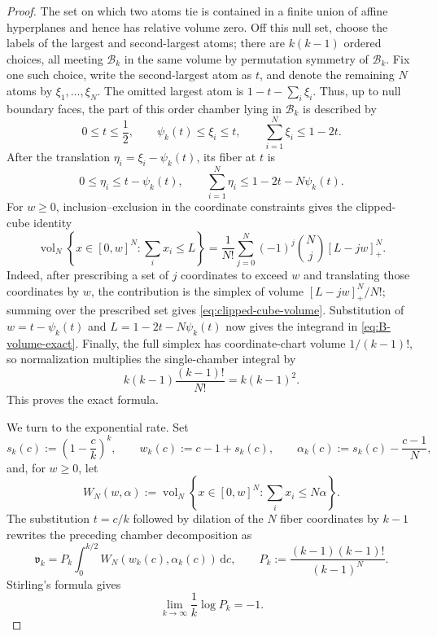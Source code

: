 \documentclass[10pt,a4paper]{amsart}
\newcommand{\body}{\mathcal{B}}
\begin{document}
\begin{proof}
The set on which two atoms tie is contained in a finite union of affine
hyperplanes and hence has relative volume zero.  Off this null set, choose
the labels of the largest and second-largest atoms; there are $k(k-1)$
ordered choices, all meeting $\body_k$ in the same volume by permutation
symmetry of $\body_k$.  Fix one such choice, write the
second-largest atom as $t$, and denote the remaining $N$ atoms by
$\xi_1,\ldots,\xi_N$.  The omitted largest atom is
$1-t-\sum_i\xi_i$.  Thus, up to null boundary faces, the part of this
order chamber lying in $\body_k$ is described by
\[
 0\le t\le\frac12,\qquad
 \psi_k(t)\le\xi_i\le t,\qquad
 \sum_{i=1}^N\xi_i\le1-2t.
\]
After the translation $\eta_i=\xi_i-\psi_k(t)$, its fiber at $t$ is
\[
 0\le\eta_i\le t-\psi_k(t),\qquad
 \sum_{i=1}^N\eta_i\le1-2t-N\psi_k(t).
\]
For $w\ge0$, inclusion--exclusion in the coordinate constraints gives the
clipped-cube identity
\begin{equation}\label{eq:clipped-cube-volume}
 \operatorname{vol}_N\left\{x\in[0,w]^N:\sum_i x_i\le L\right\}
 =\frac1{N!}\sum_{j=0}^N(-1)^j\binom Nj[L-jw]_+^N.
\end{equation}
Indeed, after prescribing a set of $j$ coordinates to exceed $w$ and
translating those coordinates by $w$, the contribution is the simplex of
volume $[L-jw]_+^N/N!$; summing over the prescribed set gives
\eqref{eq:clipped-cube-volume}.  Substitution of
$w=t-\psi_k(t)$ and $L=1-2t-N\psi_k(t)$ now gives the integrand in
\eqref{eq:B-volume-exact}.  Finally, the full simplex has coordinate-chart
volume $1/(k-1)!$, so normalization multiplies the single-chamber integral
by
\[
 k(k-1)\frac{(k-1)!}{N!}=k(k-1)^2.
\]
This proves the exact formula.

We turn to the exponential rate.  Set
\[
 s_k(c):=\left(1-\frac ck\right)^k,\qquad
 w_k(c):=c-1+s_k(c),\qquad
 \alpha_k(c):=s_k(c)-\frac{c-1}{N},
\]
and, for $w\ge0$, let
\[
 W_N(w,\alpha):=
 \operatorname{vol}_N\left\{x\in[0,w]^N:\sum_i x_i\le N\alpha\right\}.
\]
The substitution $t=c/k$ followed by dilation of the $N$ fiber coordinates
by $k-1$ rewrites the preceding chamber decomposition as
\begin{equation}\label{eq:B-volume-scaled}
 \mathfrak v_k=P_k\int_0^{k/2}W_N(w_k(c),\alpha_k(c))\,\mathrm d c,
 \qquad
 P_k:=\frac{(k-1)(k-1)!}{(k-1)^N}.
\end{equation}
Stirling's formula gives
\begin{equation}\label{eq:B-volume-prefactor}
 \lim_{k\to\infty}\frac1k\log P_k=-1.
\end{equation}


\end{proof}
\end{document}
